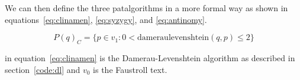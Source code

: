 
We can then define the three patalgorithms in a more formal way as shown in equations~\ref{eq:clinamen}, \ref{eq:syzygy}, and \ref{eq:antinomy}.

\begin{equation}
  P(q)_C = \{p \in v_1: 0 < \text{dameraulevenshtein}(q,p) \leq 2\}
  \label{eq:clinamen}
\end{equation}

 in equation~\ref{eq:clinamen}\marginnote{$\bm{\Sigma}$~\ref{eq:clinamen}} is the Damerau-Levenshtein algorithm as described in section~\ref{code:dl} and $v_0$ is the Faustroll text.

